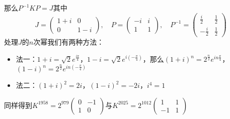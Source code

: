 \documentclass[UTF8]{ctexart}
\begin{document}
		那么$P^{-1}KP = J$其中
		\[
		J = \begin{pmatrix} 1 + i & 0 \\ 0 & 1 - i \end{pmatrix}, \quad P = \begin{pmatrix} -i & i \\ 1 & 1 \end{pmatrix}, \quad P^{-1} = \begin{pmatrix} \frac{i}{2} & \frac{1}{2} \\ -\frac{i}{2} & \frac{1}{2} \end{pmatrix}
		\]
		处理$J$的$n$次幂我们有两种方法：
		\begin{itemize}
			\item 法一：$1 + i = \sqrt{2} e^{\frac{i\pi}{4}}$，$1 - i = \sqrt{2} e^{i \left( -\frac{\pi}{4} \right)}$，那么$(1 + i)^n = 2^{\frac{n}{2}}e^{in\frac{\pi}{4}}$，$(1 - i)^n = 2^{\frac{n}{2}}e^{in\left( -\frac{\pi}{4} \right)}$
			\item 法二：$(1 + i)^2 = 2i$，$(1 - i)^2 = -2i$，$i^4 = 1$
		\end{itemize}
同样得到$K^{1958} = 2^{979} \begin{pmatrix} 0 & -1 \\ 1 & 0 \end{pmatrix}$与$K^{2025} = 2^{1012} \begin{pmatrix} 1 & 1 \\ -1 & 1 \end{pmatrix}$\\
	
	
	
\end{document}
